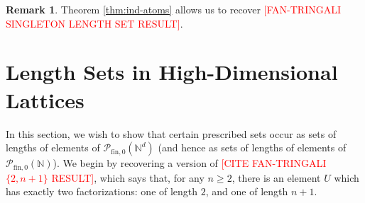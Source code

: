 \documentclass{report}
\newcommand{\NN}{\mathbb{N}}
\renewcommand{\P}{\mathcal{P}}
\newcommand{\ZZ}{\mathbb{Z}}
\newcommand{\Z}{\mathcal{Z}}
\newcommand{\llb}{\llbracket}
\newcommand{\rrb}{\rrbracket}
\newcommand{\fin}{\textrm{fin}}
\newcommand{\fon}{{\textrm{fin}, 0}}
\renewcommand{\:}{\text{:}}
\newcommand{\PN}{{\P_{\fin,0}(\NN)}}
\theoremstyle{definition}
\newtheorem{prop}[defn]{Proposition}
\newtheorem{rk}[defn]{Remark}
\begin{document}
\begin{rk}
Theorem \ref{thm:ind-atoms} allows us to recover \textcolor{red}{[FAN-TRINGALI SINGLETON LENGTH SET RESULT]}.
\end{rk}

\section{Length Sets in High-Dimensional Lattices}
In this section, we wish to show that certain prescribed sets occur as sets of lengths of elements of $\P_\fon(\NN^d)$ (and hence as sets of lengths of elements of $\PN$).
We begin by recovering a version of \textcolor{red}{[CITE FAN-TRINGALI $\{2,n+1\}$ RESULT]}, which says that, for any $n\ge 2$, there is an element $U$ which has exactly two factorizations: one of length $2$, and one of length $n+1$.






\end{document}
